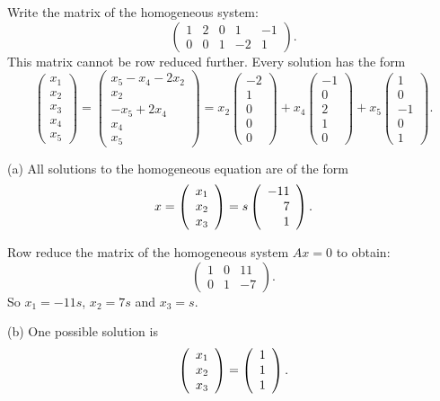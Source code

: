 \soln Write the matrix of the homogeneous system:
\[
\left(\begin{array}{rrrrr} 1 & 2 & 0 & 1 & -1 \\
0 & 0 & 1 & -2 & 1 \end{array}\right).
\]
This matrix cannot be row reduced further.  Every solution has the form
\[
\left(\begin{array}{r} x_1 \\ x_2 \\ x_3 \\ x_4 \\ x_5
\end{array}\right) = \left(\begin{array}{c} x_5 - x_4 - 2x_2 \\
x_2 \\ -x_5 + 2x_4 \\ x_4 \\ x_5 \end{array}\right) = 
x_2\left(\begin{array}{r} -2 \\ 1 \\ 0 \\ 0 \\ 0
\end{array}\right) + x_4\left(\begin{array}{r} -1 \\ 0 \\ 2 \\
1 \\ 0 \end{array}\right) + x_5\left(\begin{array}{r} 1 \\ 0 \\
-1 \\ 0 \\ 1 \end{array}\right).
\]

(a) \ans All solutions to the homogeneous equation are of the form
\[
x = \left(\begin{array}{r} x_1 \\ x_2 \\ x_3\end{array}\right) = s\left(\begin{array}{r} -11 \\ 7 \\ 1\end{array}\right).
\]

\soln Row reduce the matrix of the homogeneous system
$Ax = 0$ to obtain:
\[
\left(\begin{array}{rrr} 1 & 0 & 11 \\ 0 & 1 & -7 \end{array}\right).
\]
So $x_1 = -11s$, $x_2 = 7s$ and $x_3 = s$.

(b) \ans One possible solution is
\[ \left(\begin{array}{r} x_1 \\ x_2 \\ x_3\end{array}\right) = \left(\begin{array}{r} 1 \\ 1 \\ 1\end{array}\right). \]

